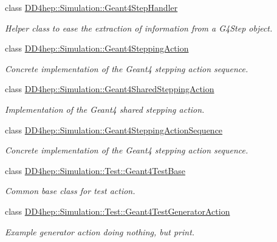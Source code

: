 \begin{DoxyCompactItemize}
class \hyperlink{class_d_d4hep_1_1_simulation_1_1_geant4_step_handler}{DD4hep::Simulation::Geant4StepHandler}
\begin{DoxyCompactList}\small\item\em Helper class to ease the extraction of information from a G4Step object. \item\end{DoxyCompactList}\item 
class \hyperlink{class_d_d4hep_1_1_simulation_1_1_geant4_stepping_action}{DD4hep::Simulation::Geant4SteppingAction}
\begin{DoxyCompactList}\small\item\em Concrete implementation of the Geant4 stepping action sequence. \item\end{DoxyCompactList}\item 
class \hyperlink{class_d_d4hep_1_1_simulation_1_1_geant4_shared_stepping_action}{DD4hep::Simulation::Geant4SharedSteppingAction}
\begin{DoxyCompactList}\small\item\em Implementation of the Geant4 shared stepping action. \item\end{DoxyCompactList}\item 
class \hyperlink{class_d_d4hep_1_1_simulation_1_1_geant4_stepping_action_sequence}{DD4hep::Simulation::Geant4SteppingActionSequence}
\begin{DoxyCompactList}\small\item\em Concrete implementation of the Geant4 stepping action sequence. \item\end{DoxyCompactList}\item 
class \hyperlink{class_d_d4hep_1_1_simulation_1_1_test_1_1_geant4_test_base}{DD4hep::Simulation::Test::Geant4TestBase}
\begin{DoxyCompactList}\small\item\em Common base class for test action. \item\end{DoxyCompactList}\item 
class \hyperlink{class_d_d4hep_1_1_simulation_1_1_test_1_1_geant4_test_generator_action}{DD4hep::Simulation::Test::Geant4TestGeneratorAction}
\begin{DoxyCompactList}\small\item\em Example generator action doing nothing, but print. \item\end{DoxyCompactList}\item 

\end{DoxyCompactItemize}
